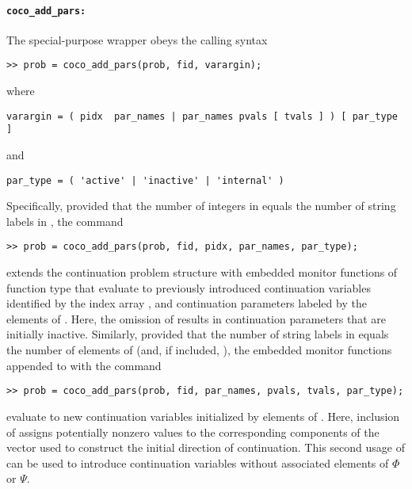 \paragraph{\texttt{coco\_add\_pars:}}
The  special-purpose wrapper obeys the calling syntax
\begin{lstlisting}[language=coco-highlight]
>> prob = coco_add_pars(prob, fid, varargin);
\end{lstlisting}
where
\begin{lstlisting}[language=coco-highlight]
varargin = ( pidx  par_names | par_names pvals [ tvals ] ) [ par_type ]
\end{lstlisting}
and
\begin{lstlisting}[language=coco-highlight]
par_type = ( 'active' | 'inactive' | 'internal' )
\end{lstlisting}
Specifically, provided that the number of integers in  equals the number of string labels in , the command
\begin{lstlisting}[language=coco-highlight]
>> prob = coco_add_pars(prob, fid, pidx, par_names, par_type);
\end{lstlisting}
extends the continuation problem structure with embedded monitor functions of function type  that evaluate to previously introduced continuation variables identified by the index array , and continuation parameters labeled by the elements of . Here, the omission of  results in continuation parameters that are initially inactive. Similarly, provided that the number of string labels in  equals the number of elements of  (and, if included, ), the embedded monitor functions appended to  with the command
\begin{lstlisting}[language=coco-highlight]
>> prob = coco_add_pars(prob, fid, par_names, pvals, tvals, par_type);
\end{lstlisting}
evaluate to new continuation variables initialized by elements of . Here, inclusion of  assigns potentially nonzero values to the corresponding components of the vector used to construct the initial direction of continuation. This second usage of  can be used to introduce continuation variables without associated elements of $\Phi$ or $\Psi$.

